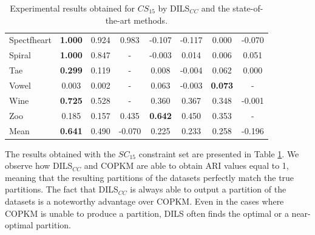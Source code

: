 \documentclass[review]{elsarticle}
\begin{document}
\begin{table}[!h]
{\begin{tabular}{lccccccc}
			Spectfheart & \textbf{1.000} & 0.924 & 0.983 & -0.107 & -0.117 & 0.000 & -0.070 \\
			Spiral & \textbf{1.000} & 0.847 & - & -0.003 & 0.014 & 0.006 & 0.051 \\
			Tae & \textbf{0.299} & 0.119 & - & 0.008 & -0.004 & 0.062 & 0.000 \\
			Vowel & 0.003 & 0.002 & - & 0.063 & -0.003 & \textbf{0.073} & - \\
			Wine & \textbf{0.725} & 0.528 & - & 0.360 & 0.367 & 0.348 & -0.001 \\
			Zoo & 0.185 & 0.157 & 0.435 & \textbf{0.642} & 0.450 & 0.353 & - \\
			\hline
			Mean & \textbf{0.641} & 0.490 & -0.070 & 0.225 & 0.233 & 0.258 & -0.196 \\
			\hline
			
		\end{tabular}}
		
	\caption{Experimental results obtained for $CS_{15}$ by DILS$_{CC}$ and the state-of-the-art methods.}
	\label{tab:results15}
\end{table}

The results obtained with the $SC_{15}$ constraint set are presented in Table \ref{tab:results15}. We observe how DILS$_{CC}$ and COPKM are able to obtain ARI values equal to 1, meaning that the resulting partitions of the datasets perfectly match the true partitions. The fact that DILS$_{CC}$ is always able to output a partition of the datasets is a noteworthy advantage over COPKM. Even in the cases where COPKM is unable to produce a partition, DILS often finds the optimal or a near-optimal partition.
\end{document}

